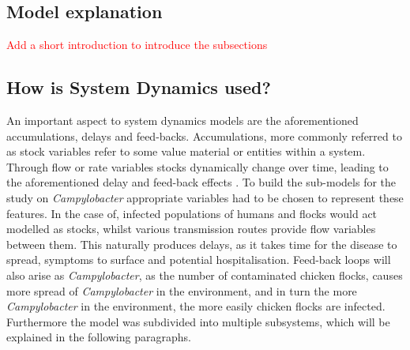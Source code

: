 \subsection{Model explanation}
\textcolor{red}{Add a short introduction to introduce the subsections}
\subsection{How is System Dynamics used?}
An important aspect to system dynamics models are the aforementioned accumulations, delays and feed-backs. Accumulations, more commonly referred to as stock variables refer to some value material or entities within a system. Through flow or rate variables stocks dynamically change over time, leading to the aforementioned delay and feed-back effects \parencite{sterman_system_2001}. To build the sub-models for the study on \textit{Campylobacter} appropriate variables had to be chosen to represent these features. In the case of, infected populations of humans and flocks would act modelled as stocks, whilst various transmission routes provide flow variables between them. This naturally produces delays, as it takes time for the disease to spread, symptoms to surface and potential hospitalisation. Feed-back loops will also arise as \textit{Campylobacter}, as the number of contaminated chicken flocks, causes more spread of \textit{Campylobacter} in the environment, and in turn the more \textit{Campylobacter} in the environment, the more easily chicken flocks are infected. Furthermore the model was subdivided into multiple subsystems, which will be explained in the following paragraphs. 


